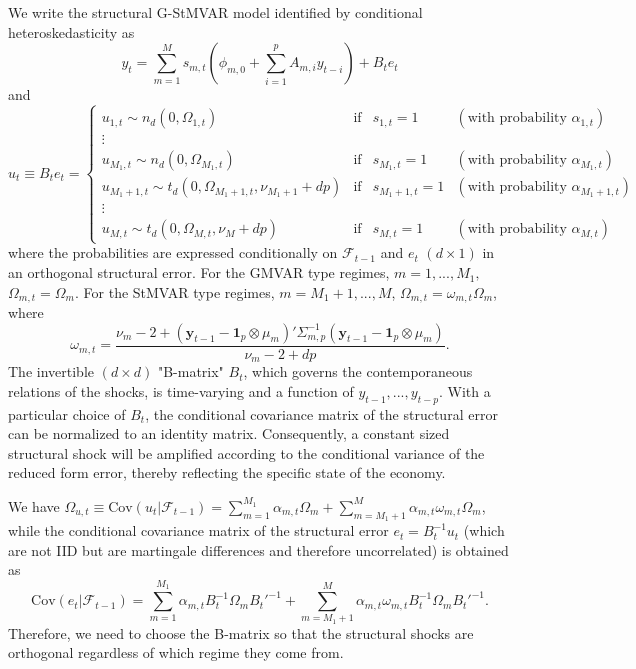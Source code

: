 \documentclass[nojss]{jss}
\begin{document}
We write the structural G-StMVAR model identified by conditional heteroskedasticity \citep{Virolainen2:2021} as
\begin{equation}
y_t = \sum_{m=1}^Ms_{m,t}(\phi_{m,0}+\sum_{i=1}^pA_{m,i}y_{t-i}) + B_te_t
\end{equation}
and
\begin{equation}
u_t\equiv B_te_t =
\left\lbrace\begin{matrix}
u_{1,t}\sim n_d(0,\Omega_{1,t}) & \text{if} & s_{1,t}=1 & (\text{with probability } \alpha_{1,t}) \\
\vdots & & & \\
u_{M_1,t}\sim n_d(0,\Omega_{M_1,t}) & \text{if} & s_{M_1,t}=1 & (\text{with probability } \alpha_{M_1,t}) \\
u_{M_1+1,t}\sim t_d(0,\Omega_{M_1+1,t},\nu_{M_1+1} + dp) & \text{if} & s_{M_1+1,t}=1 & (\text{with probability } \alpha_{M_1+1,t}) \\
\vdots & & & \\
u_{M,t}\sim t_d(0,\Omega_{M,t},\nu_M + dp) & \text{if} & s_{M,t}=1 & (\text{with probability } \alpha_{M,t})
\end{matrix}\right.
\end{equation}
where the probabilities are expressed conditionally on $\mathcal{F}_{t-1}$ and $e_t$ $(d \times 1)$ in an orthogonal structural error.  For the GMVAR type regimes, $m=1,...,M_1$‚ $\Omega_{m,t}=\Omega_m$.  For the StMVAR type regimes,  $m=M_1+1,...,M$,  $\Omega_{m,t}=\omega_{m,t}\Omega_m$, where
\begin{equation}\label{eq:sigma_mt}
\omega_{m,t} = \frac{\nu_m - 2 + (\boldsymbol{y}_{t-1} - \boldsymbol{1}_p\otimes\mu_m)'\Sigma_{m,p}^{-1}(\boldsymbol{y}_{t-1} - \boldsymbol{1}_p\otimes\mu_m)}{\nu_m - 2 + dp}.
\end{equation}
The invertible $(d\times d)$ "B-matrix" $B_t$, which governs the contemporaneous relations of the shocks, is time-varying and a function of $y_{t-1},..., y_{t-p}$. With a particular choice of $B_t$,  the conditional covariance matrix of the structural error can be normalized to an identity matrix. Consequently,  a constant sized structural shock will be amplified according to the conditional variance of the reduced form error, thereby reflecting the specific state of the economy.

We have $\Omega_{u,t}\equiv\text{Cov}(u_t|\mathcal{F}_{t-1})=\sum_{m=1}^{M_1}\alpha_{m,t}\Omega_m + \sum_{m=M_1+1}^{M}\alpha_{m,t}\omega_{m,t}\Omega_m$,  while the conditional covariance matrix of the structural error $e_t=B_t^{-1}u_t$ (which are not IID but are martingale differences and therefore uncorrelated) is obtained as
\begin{equation}
\text{Cov}(e_t|\mathcal{F}_{t-1})=\sum_{m=1}^{M_1}\alpha_{m,t}B_t^{-1}\Omega_mB_t'^{-1} + \sum_{m=M_1+1}^{M}\alpha_{m,t}\omega_{m,t}B_t^{-1}\Omega_mB_t'^{-1}.
\end{equation}
Therefore, we need to choose the B-matrix so that the structural shocks are orthogonal regardless of which regime they come from.
\end{document}
